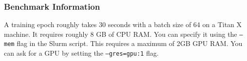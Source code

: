 \subsubsection{Benchmark Information}
A training epoch roughly takes 30 seconds with a batch size of 64 on a Titan X machine. It requires roughly 8 GB of CPU RAM. You can specify it using the \texttt{--mem} flag in the Slurm script. This requires a maximum of 2GB GPU RAM. You can ask for a GPU by setting the \texttt{--gres=gpu:1} flag. 
